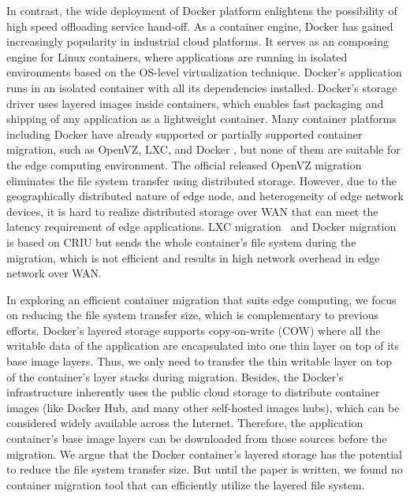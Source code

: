 In contrast, the wide deployment of Docker platform enlightens the possibility of high speed offloading service hand-off. As a container engine, Docker has gained increasingly popularity in industrial cloud platforms. It serves as an composing engine for Linux containers, where applications are running in isolated environments based on the OS-level virtualization technique.
Docker's application runs in an isolated container with all its dependencies installed. Docker's storage driver uses layered images inside containers, which enables fast packaging and shipping of any application as a lightweight container. 
Many container platforms including Docker have already supported or partially supported container migration, such as OpenVZ\cite{openvz}, LXC\cite{qiu2016evaluating}, and Docker \cite{phaul,boucherPhaul}, but none of them are suitable for the edge computing environment. The official released OpenVZ migration~\cite{phaul} eliminates the file system transfer using distributed storage. However, due to the geographically distributed nature of edge node, and heterogeneity of edge network devices, it is hard to realize distributed storage over WAN that can meet the latency requirement of edge applications. 
LXC migration~\cite{qiu2016evaluating} and Docker migration~\cite{phaul, boucherPhaul} is based on CRIU\cite{criu} but sends the whole container's file system during the migration, which is not efficient and results in high network overhead in edge network over WAN.

In exploring an efficient container migration that suits edge computing, we focus on reducing the file system transfer size, which is complementary to previous efforts.
%
Docker's layered storage supports copy-on-write (COW) where all the writable data of the application are encapsulated into one thin layer on top of its base image layers.
Thus, we only need to transfer the thin writable layer on top of the container's layer stacks during migration. Besides, the Docker's infrastructure inherently uses the public cloud storage to distribute container images (like Docker Hub\cite{dockerhub}, and many other self-hosted images hubs), which can be considered widely available across the Internet. 
Therefore, the application container's base image layers can be downloaded from those sources before the migration. We argue that the Docker container's layered storage has the potential to reduce the file system transfer size. But until the paper is written, we found no container migration tool that can efficiently utilize the layered file system. 





